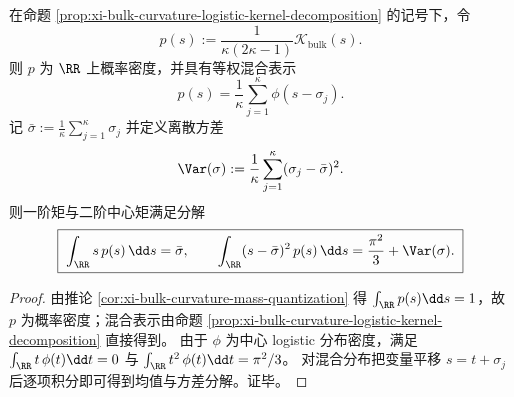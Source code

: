 \begin{corollary}\label{cor:xi-bulk-curvature-probability-moments}
在命题 \ref{prop:xi-bulk-curvature-logistic-kernel-decomposition} 的记号下，令
\[
p(s):=\frac{1}{\kappa(2\kappa-1)}\mathcal{K}_{\mathrm{bulk}}(s).
\]
则 \(p\) 为 \(\RR\) 上概率密度，并具有等权混合表示
\[
\boxed{\;
p(s)=\frac{1}{\kappa}\sum_{j=1}^{\kappa}\phi(s-\sigma_j).\;}
\]
记 \(\bar\sigma:=\frac{1}{\kappa}\sum_{j=1}^\kappa\sigma_j\) 并定义离散方差
\[
\Var(\sigma):=\frac{1}{\kappa}\sum_{j=1}^{\kappa}(\sigma_j-\bar\sigma)^2.
\]
则一阶矩与二阶中心矩满足分解
\[
\boxed{\;
\int_{\RR}s\,p(s)\,\dd s=\bar\sigma,\qquad
\int_{\RR}(s-\bar\sigma)^2\,p(s)\,\dd s=\frac{\pi^2}{3}+\Var(\sigma).\;}
\]
\end{corollary}
\begin{proof}
由推论 \ref{cor:xi-bulk-curvature-mass-quantization} 得 \(\int_{\RR}p(s)\dd s=1\)，故 \(p\) 为概率密度；混合表示由命题 \ref{prop:xi-bulk-curvature-logistic-kernel-decomposition} 直接得到。
由于 \(\phi\) 为中心 logistic 分布密度，满足 \(\int_{\RR} t\,\phi(t)\dd t=0\) 与 \(\int_{\RR} t^2\,\phi(t)\dd t=\pi^2/3\)。
对混合分布把变量平移 \(s=t+\sigma_j\) 后逐项积分即可得到均值与方差分解。证毕。
\end{proof}


